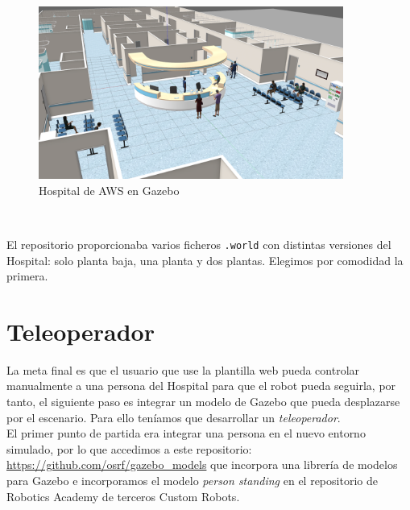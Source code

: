 \begin{figure} [H]
  \begin{center}
    \includegraphics[width=10cm]{imagenes/cap5/hospital_world.png}
  \end{center}
  \caption[Hospital de AWS en Gazebo]{Hospital de AWS en Gazebo}
  \label{fig:hospital_gazebo}
\end{figure}\

El repositorio proporcionaba varios ficheros \texttt{.world} con distintas versiones del Hospital: solo planta baja, una planta y dos plantas. Elegimos por comodidad la primera.\\



\section{Teleoperador}
\label{sec:teleoperador}

La meta final es que el usuario que use la plantilla web pueda controlar manualmente a una persona del Hospital para que el robot pueda seguirla, por tanto, el siguiente paso es integrar un modelo de Gazebo que pueda desplazarse por el escenario. Para ello teníamos que desarrollar un \textit{teleoperador}.\\

El primer punto de partida era integrar una persona en el nuevo entorno simulado, por lo que accedimos a este repositorio: \url{https://github.com/osrf/gazebo_models} que incorpora una librería de modelos para Gazebo e incorporamos el modelo \textit{person standing} en el repositorio de Robotics Academy de terceros Custom Robots.\\

